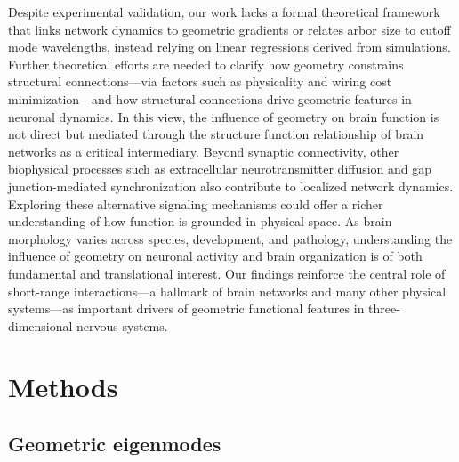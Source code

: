\documentclass{article}
\begin{document}
Despite experimental validation, our work lacks a formal theoretical framework that links network dynamics to geometric gradients or relates arbor size to cutoff mode wavelengths, instead relying on linear regressions derived from simulations. Further theoretical efforts are needed to clarify how geometry constrains structural connections---via factors such as physicality\cite{posfai2024impact} and wiring cost minimization\cite{bullmore2012economy}---and how structural connections drive geometric features in neuronal dynamics. In this view, the influence of geometry on brain function is not direct but mediated through the structure function relationship of brain networks as a critical intermediary\cite{suarez2020linking, fotiadis2024structure}. Beyond synaptic connectivity, other biophysical processes such as extracellular neurotransmitter diffusion\cite{randi2023neural} and gap junction-mediated synchronization\cite{ponce2018whole} also contribute to localized network dynamics. Exploring these alternative signaling mechanisms could offer a richer understanding of how function is grounded in physical space. As brain morphology varies across species, development, and pathology\cite{thompson2004mapping}, understanding the influence of geometry on neuronal activity\cite{pang2023geometric} and brain organization\cite{pang2025geometric} is of both fundamental and translational interest. Our findings reinforce the central role of short-range interactions---a hallmark of brain networks and many other physical systems---as important drivers of geometric functional features in three-dimensional nervous systems.

\section*{Methods}

\subsection*{Geometric eigenmodes}
\end{document}
